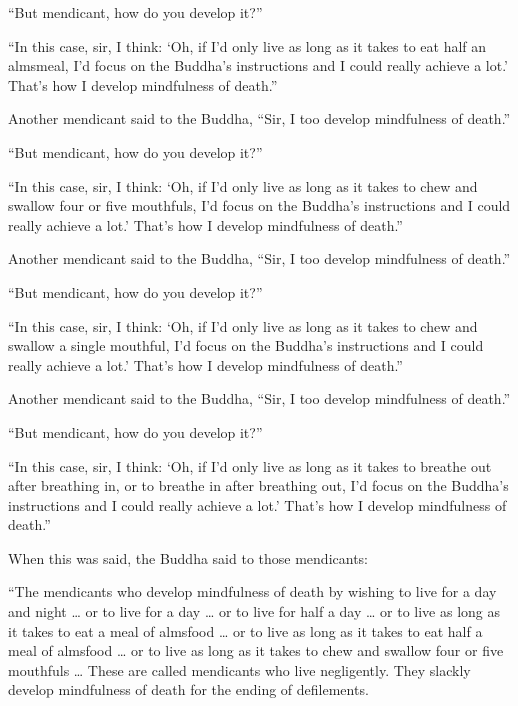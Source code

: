 \documentclass[12pt,openany]{book}%
\begin{document}
“But mendicant, how do you develop it?” 

“In this case, sir, I think: ‘Oh, if I’d only live as long as it takes to eat half an almsmeal, I’d focus on the Buddha’s instructions and I could really achieve a lot.’ That’s how I develop mindfulness of death.” 

Another mendicant said to the Buddha, “Sir, I too develop mindfulness of death.” 

“But mendicant, how do you develop it?” 

“In this case, sir, I think: ‘Oh, if I’d only live as long as it takes to chew and swallow four or five mouthfuls, I’d focus on the Buddha’s instructions and I could really achieve a lot.’ That’s how I develop mindfulness of death.” 

Another mendicant said to the Buddha, “Sir, I too develop mindfulness of death.” 

“But mendicant, how do you develop it?” 

“In this case, sir, I think: ‘Oh, if I’d only live as long as it takes to chew and swallow a single mouthful, I’d focus on the Buddha’s instructions and I could really achieve a lot.’ That’s how I develop mindfulness of death.” 

Another mendicant said to the Buddha, “Sir, I too develop mindfulness of death.” 

“But mendicant, how do you develop it?” 

“In this case, sir, I think: ‘Oh, if I’d only live as long as it takes to breathe out after breathing in, or to breathe in after breathing out, I’d focus on the Buddha’s instructions and I could really achieve a lot.’ That’s how I develop mindfulness of death.” 

When this was said, the Buddha said to those mendicants: 

“The mendicants who develop mindfulness of death by wishing to live for a day and night … or to live for a day … or to live for half a day … or to live as long as it takes to eat a meal of almsfood … or to live as long as it takes to eat half a meal of almsfood … or to live as long as it takes to chew and swallow four or five mouthfuls … These are called mendicants who live negligently. They slackly develop mindfulness of death for the ending of defilements. 
\end{document}
